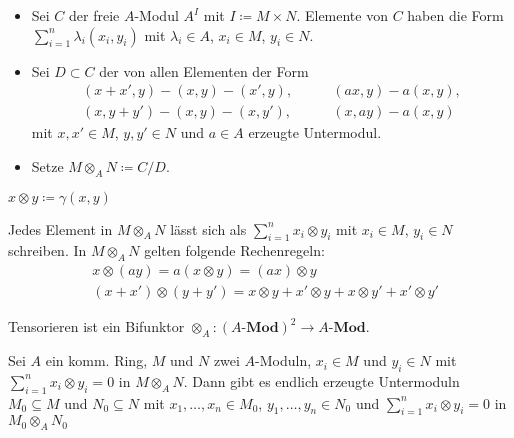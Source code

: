\documentclass{cheat-sheet}
\newcommand{\Mod}{\mathbf{Mod}} %
\newcommand{\LMod}[1]{{#1}\text{-}\Mod} %
\begin{document}
\begin{konstr}
  \begin{itemize}
    \item Sei $C$ der freie $A$-Modul $A^I$ mit $I \coloneqq M \times N$.
    Elemente von $C$ haben die Form ${\sum}_{i=1}^n \lambda_i (x_i, y_i)$ mit $\lambda_i \!\in\! A$, $x_i \!\in\! M$, $y_i \!\in\! N$.
    \item Sei $D \subset C$ der von allen Elementen der Form
    \begin{align*}
      (x + x', y) - (x, y) - (x', y), \qquad
      & (ax, y) - a (x, y), \\
      (x, y + y') - (x, y) - (x, y'), \qquad
      & (x, ay) - a (x, y)
    \end{align*}
    mit $x, x' \in M$, $y, y' \in N$ und $a \in A$ erzeugte Untermodul.
    \item Setze $M \otimes_A N \coloneqq C/D$.
  \end{itemize}
\end{konstr}

\begin{nota}
  $x \otimes y \coloneqq \gamma(x, y)$
\end{nota}

\begin{bem}
  Jedes Element in $M \otimes_A N$ lässt sich als ${\sum}_{i=1}^n x_i \otimes y_i$ mit $x_i \in M$, $y_i \in N$ schreiben.
  In $M \otimes_A N$ gelten folgende Rechenregeln:
  \begin{align*}
    & x \otimes (ay) = a (x \otimes y) = (ax) \otimes y \\
    & (x + x') \otimes (y + y') = x \otimes y + x' \otimes y + x \otimes y' + x' \otimes y'
  \end{align*}
\end{bem}

\begin{lem}
  Tensorieren ist ein Bifunktor \enspace
  $\otimes_A : (\LMod{A})^2 \to \LMod{A}$.
\end{lem}

\begin{lem}
  Sei $A$ ein komm. Ring, $M$ und $N$ zwei $A$-Moduln, $x_i \in M$ und $y_i \in N$ mit ${\sum}_{i=1}^n x_i \otimes y_i = 0$ in $M \otimes_A N$.
  Dann gibt es endlich erzeugte Untermoduln $M_0 \subseteq M$ und $N_0 \subseteq N$ mit $x_1, \ldots, x_n \in M_0$, $y_1, \ldots, y_n \in N_0$ und ${\sum}_{i=1}^n x_i \otimes y_i = 0$ in $M_0 \otimes_A N_0$
\end{lem}
\end{document}
